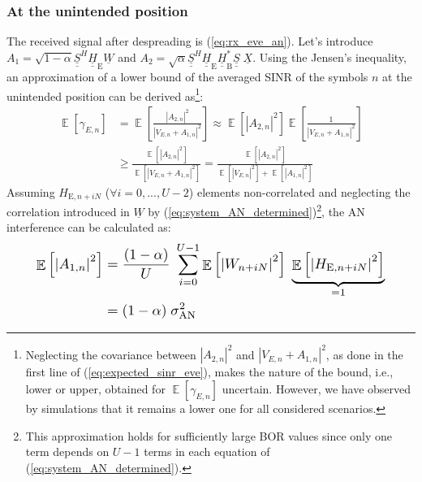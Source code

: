 \documentclass[a4paper,11pt]{article}
\begin{document}
\subsubsection{At the unintended position}
\label{subsub:unintended_sinr}
The received signal after despreading is (\ref{eq:rx_eve_an}). Let's introduce $A_1  = \sqrt{1-\alpha} \underline{\underline{S}}^H \underline{\underline{H}}_{\text{E}} \underline{W}$ and $A_2 = \sqrt{\alpha}  \underline{\underline{S}}^H  \underline{\underline{H}}_{\text{E}}  \underline{\underline{H}}^*_{\text{B}} \underline{\underline{S}}\; \underline{X}$. Using the Jensen's inequality, an approximation of a lower bound of the averaged SINR of the symbols $n$ at the unintended position can be derived as\footnote{Neglecting the covariance between $\left|A_{2,n}\right|^2$ and $\left| V_{E,n} + A_{1,n}\right|^2$, as  done in the first line of (\ref{eq:expected_sinr_eve}), makes the nature of the bound, i.e., lower or upper, obtained for $\mathop{\mathbb{E}} \left[\gamma_{E,n}\right]$ uncertain. However, we have observed by simulations that it remains a lower one for all considered scenarios.}:
\begin{equation}
\begin{split}
    \mathop{\mathbb{E}} \left[\gamma_{E,n}\right] &= \mathop{\mathbb{E}} \left[ \frac{  \left| A_{2,n} \right|^2  }{  \left| V_{E,n} + A_{1,n} \right|^2 }  \right]  \approx  \mathop{\mathbb{E}} \left[ \left| A_{2,n} \right|^2 \right]  \mathop{\mathbb{E}} \left[ \frac{1}{ \left| V_{E,n} + A_{1,n} \right|^2} \right]  \\
    & \geq \frac{\mathop{\mathbb{E}} \left[ \left| A_{2,n} \right|^2 \right] }{\mathop{\mathbb{E}} \left[\left| V_{E,n} + A_{1,n} \right|^2 \right]} =  \frac{\mathop{\mathbb{E}} \left[ \left| A_{2,n} \right|^2 \right] }{\mathop{\mathbb{E}} \left[\left| V_{E,n} \right|^2 \right] +  \mathop{\mathbb{E}} \left[\left|A_{1,n} \right|^2 \right]}
    \label{eq:expected_sinr_eve}
\end{split}
\end{equation}
Assuming $H_{\text{E}, n + iN}$ ($\forall i = 0,...,U-2$) elements non-correlated and neglecting the correlation introduced in $\underline{W}$ by (\ref{eq:system_AN_determined})\footnote{This approximation holds for sufficiently large BOR values since only one term depends on $U-1$ terms in each equation of (\ref{eq:system_AN_determined}).}, the AN interference can be calculated as:
\begin{equation}
\resizebox{0.89\hsize}{!}{$
    \begin{split}
        \mathop{\mathbb{E}}\left[ \left| A_{1,n} \right|^2 \right]
        &= \frac{(1-\alpha)}{U} \; \sum_{i=0}^{U-1} \mathop{\mathbb{E}}\left[\left| W_{n+iN} \right|^2 \right]  \; \underbrace{\mathop{\mathbb{E}}\left[\left|  H_{\text{E}, n + iN} \right|^2 \right]}_{=1} \\
        &= (1-\alpha)\; \sigma^2_{\text{AN}}
    \end{split}$}
\end{equation}
\end{document}
